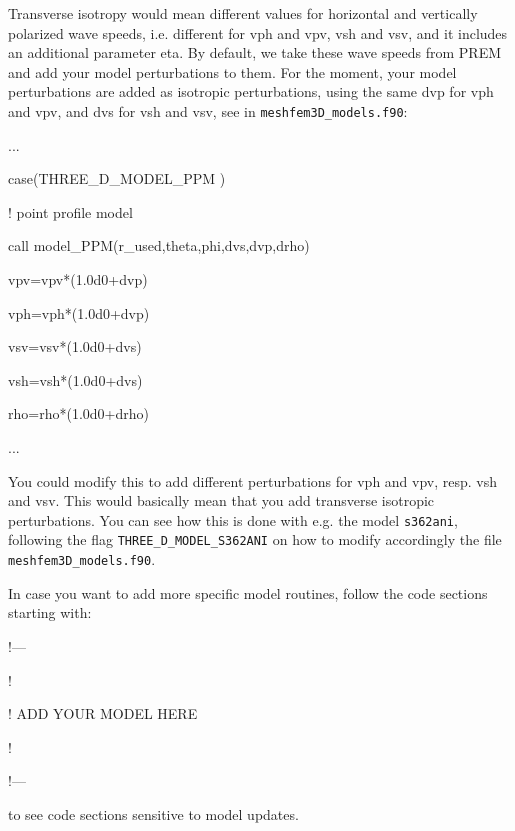 \documentclass[oneside,english]{book}
\newenvironment{lyxcode}
{\begin{list}{}{
\setlength{\rightmargin}{\leftmargin}
\setlength{\listparindent}{0pt}%
\raggedright
\setlength{\itemsep}{0pt}
\setlength{\parsep}{0pt}
\normalfont\ttfamily}%
 \item[]}
{\end{list}}
\begin{document}
\begin{description}
\begin{enumerate}
  \item Transverse isotropy would mean different values for horizontal and vertically polarized wave speeds,
  i.e. different for vph and   vpv, vsh and vsv, and it includes an additional parameter eta.
  By default, we take these wave speeds from PREM and add your model perturbations to them.
  For the moment, your model perturbations are added as isotropic perturbations, using the same dvp for vph and vpv,
  and dvs for vsh   and vsv, see in \texttt{meshfem3D\_models.f90}:
  \begin{lyxcode}
{\footnotesize  ... }{\footnotesize \par}
{\footnotesize     case(THREE\_D\_MODEL\_PPM ) }{\footnotesize \par}
{\footnotesize       ! point profile model }{\footnotesize \par}
{\footnotesize       call model\_PPM(r\_used,theta,phi,dvs,dvp,drho) }{\footnotesize \par}
{\footnotesize       vpv=vpv*(1.0d0+dvp) }{\footnotesize \par}
{\footnotesize       vph=vph*(1.0d0+dvp) }{\footnotesize \par}
{\footnotesize       vsv=vsv*(1.0d0+dvs) }{\footnotesize \par}
{\footnotesize       vsh=vsh*(1.0d0+dvs) }{\footnotesize \par}
{\footnotesize       rho=rho*(1.0d0+drho) }{\footnotesize \par}
{\footnotesize  ... }{\footnotesize \par}
  \end{lyxcode}
 You could modify this to add different perturbations for vph and vpv, resp. vsh and vsv.
 This would basically mean that you add transverse isotropic perturbations.
 You can see how this is done with e.g. the model \texttt{s362ani},
 following the flag \texttt{THREE\_D\_MODEL\_S362ANI} on how to modify accordingly the file \texttt{meshfem3D\_models.f90}.

  In case you want to add more specific model routines, follow the code sections starting with:
  \begin{lyxcode}
{\footnotesize  !--- }{\footnotesize \par}
{\footnotesize  ! }{\footnotesize \par}
{\footnotesize  ! ADD YOUR MODEL HERE }{\footnotesize \par}
{\footnotesize  ! }{\footnotesize \par}
{\footnotesize  !--- }{\footnotesize \par}
  \end{lyxcode}
  to see code sections sensitive to model updates.

  \end{enumerate}

\end{description}
\end{document}
